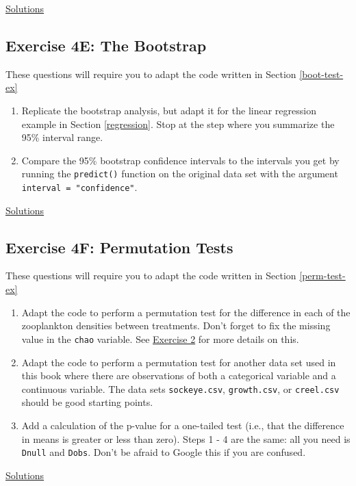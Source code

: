 \documentclass[]{book}
\providecommand{\tightlist}{%
  \setlength{\itemsep}{0pt}\setlength{\parskip}{0pt}}
\begin{document}
\protect\hyperlink{ex4d-answers}{Solutions}

\hypertarget{exercise-4e-the-bootstrap-2}{%
\subsection*{Exercise 4E: The Bootstrap}\label{exercise-4e-the-bootstrap-2}}

These questions will require you to adapt the code written in Section \ref{boot-test-ex}

\begin{enumerate}
\def\labelenumi{\arabic{enumi}.}
\tightlist
\item
  Replicate the bootstrap analysis, but adapt it for the linear regression example in Section \ref{regression}. Stop at the step where you summarize the 95\% interval range.
\item
  Compare the 95\% bootstrap confidence intervals to the intervals you get by running the \texttt{predict()} function on the original data set with the argument \texttt{interval\ =\ "confidence"}.
\end{enumerate}

\protect\hyperlink{ex4e-answers}{Solutions}

\hypertarget{exercise-4f-permutation-tests-2}{%
\subsection*{Exercise 4F: Permutation Tests}\label{exercise-4f-permutation-tests-2}}

These questions will require you to adapt the code written in Section \ref{perm-test-ex}

\begin{enumerate}
\def\labelenumi{\arabic{enumi}.}
\tightlist
\item
  Adapt the code to perform a permutation test for the difference in each of the zooplankton densities between treatments. Don't forget to fix the missing value in the \texttt{chao} variable. See \protect\hyperlink{ex1b}{Exercise 2} for more details on this.
\item
  Adapt the code to perform a permutation test for another data set used in this book where there are observations of both a categorical variable and a continuous variable. The data sets \texttt{sockeye.csv}, \texttt{growth.csv}, or \texttt{creel.csv} should be good starting points.
\item
  Add a calculation of the p-value for a one-tailed test (i.e., that the difference in means is greater or less than zero). Steps 1 - 4 are the same: all you need is \texttt{Dnull} and \texttt{Dobs}. Don't be afraid to Google this if you are confused.
\end{enumerate}

\protect\hyperlink{ex4f-answers}{Solutions}


\end{document}
